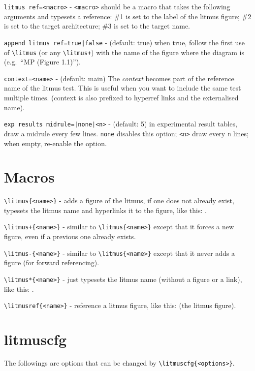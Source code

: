 \documentclass[a4paper]{article}
\begin{document}
\verb!litmus ref=<macro>! - \verb!<macro>! should be a macro that takes
  the following arguments and typesets a reference:
  \#1 is set to the label of the litmus figure;
  \#2 is set to the target architecture;
  \#3 is set to the target name.

\verb!append litmus ref=true|false! - (default: true) when true, follow the
first use of \verb!\litmus! (or any \verb!\litmus+!) with the name of the
figure where the diagram is (e.g.\ ``MP (Figure 1.1)'').

\verb!context=<name>! - (default: main) The \textit{context} becomes part of
the reference name of the litmus test. This is useful when you want to include
the same test multiple times. (context is also prefixed to hyperref links and
the externalised name).

\verb!exp results midrule=|none|<n>! - (default: 5) in experimental result
tables, draw a midrule every few lines. \verb!none! disables this option;
\verb!<n>! draw every \verb!n! lines; when empty, re-enable the option.

\section{Macros}
\verb|\litmus{<name>}| - adds a figure of the litmus, if one does not
already exist, typesets the litmus name and hyperlinks it to the
figure, like this: .

\verb|\litmus+{<name>}| - similar to \verb|\litmus{<name>}| except
that it forces a new figure, even if a previous one already exists.

\verb|\litmus-{<name>}| - similar to \verb|\litmus{<name>}| except
that it never adds a figure (for forward referencing).

\verb|\litmus*{<name>}| - just typesets the litmus name (without a
figure or a link), like this: .

\vspace{4ex}

\verb|\litmusref{<name>}| - reference a litmus figure, like this:  (the  litmus figure).

\vspace{4ex}

\section{litmuscfg}
The followings are options that can be changed by
\verb|\litmuscfg{<options>}|.
\end{document}
